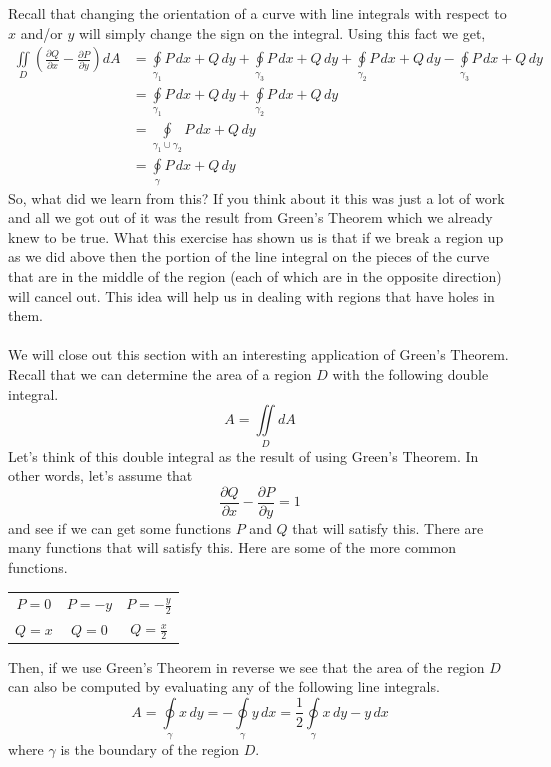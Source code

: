 \documentclass[10pt,reqno]{book}
\theoremstyle{definition}
\begin{document}
	Recall that changing the orientation of a curve with line integrals with respect to $ x $ and/or $ y $ will simply change the sign on the integral. Using this fact we get,
	\begin{align*}
		\iint\limits_D \left( \frac{\partial Q}{\partial x} - \frac{\partial P}{\partial y} \right)dA &=  \oint\limits_{\gamma_1} P\,dx + Q\,dy + \oint\limits_{\gamma_3} P\,dx + Q\,dy + \oint\limits_{\gamma_2} P\,dx + Q\,dy - \oint\limits_{\gamma_3} P\,dx + Q\,dy\\
		&= 	\oint\limits_{\gamma_1} P\,dx + Q\,dy + \oint\limits_{\gamma_2} P\,dx + Q\,dy\\
		&= \oint\limits_{\gamma_1 \cup \gamma_2} P\,dx + Q\,dy\\
		&= \oint\limits_{\gamma} P\,dx + Q\,dy
	\end{align*}
	So, what did we learn from this? If you think about it this was just a lot of work and all we got out of it was the result from Green's Theorem which we already knew to be true. What this exercise has shown us is that if we break a region up as we did above then the portion of the line integral on the pieces of the curve that are in the middle of the region (each of which are in the opposite direction) will cancel out. This idea will help us in dealing with regions that have holes in them. \\ \\
	We will close out this section with an interesting application of Green's Theorem. Recall that we can determine the area of a region $ D $ with the following double integral.
	\[ A = \iint\limits_D dA \]
	Let's think of this double integral as the result of using Green's Theorem.  In other words, let's assume that
	\[ \frac{\partial Q}{\partial x} - \frac{\partial P}{\partial y} = 1 \]
	and see if we can get some functions $ P $ and $ Q $ that will satisfy this. There are many functions that will satisfy this. Here are some of the more common functions.
	\begin{center}
		\begin{tabular}{c|c|c}
			$ P = 0 $ & $ P = -y $ & $ \displaystyle{P = -\frac{y}{2}} $ \\[8pt]
			$ Q = x $ & $ Q = 0 $ & $ \displaystyle{Q = \frac{x}{2}} $
		\end{tabular}
	\end{center}
	Then, if we use Green's Theorem in reverse we see that the area of the region $ D $ can also be computed by evaluating any of the following line integrals.
	\[ A = \oint\limits_{\gamma} x\,dy = -\oint\limits_{\gamma} y\,dx = \frac{1}{2} \oint\limits_{\gamma} x\,dy - y\,dx \]
	where $ \gamma $ is the boundary of the region $ D $.
	
\end{document}
